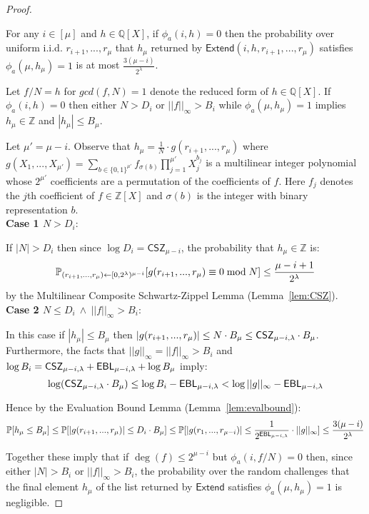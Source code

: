 \begin{proof}
\begin{subclaim} 
For any $i \in [\mu]$ and $h \in \mathbb{Q}[X]$, if $\phi_a(i, h) = 0$ then the probability over uniform i.i.d. $r_{i+1},...,r_\mu$ that $h_\mu$ returned by $\textsf{Extend}(i,h, r_{i+1},...,r_\mu)$ satisfies $\phi_a(\mu, h_\mu) = 1$ is at most $\frac{3(\mu - i)}{2^\lambda}$. 
\end{subclaim} 

Let $f/N = h$ for $gcd(f, N) = 1$ denote the reduced form of $h \in \mathbb{Q}[X]$. If $\phi_a(i,h) = 0$ then either $N > D_i$ or $||f||_\infty > B_i$ while $\phi_a(\mu, h_\mu) = 1$ implies $h_\mu \in \mathbb{Z}$ and $|h_\mu| \leq B_\mu$.

 Let $\mu' = \mu - i$. Observe that $h_\mu = \frac{1}{N} \cdot g(r_{i+1},...,r_\mu)$ where $g(X_1,...,X_{\mu'}) = \sum_{b \in \{0,1\}^{\mu'}} f_{\sigma(b)} \prod_{j=1}^{\mu'}X_j^{b_j}$ is a multilinear integer polynomial whose $2^{\mu'}$ coefficients are a permutation of the coefficients of $f$. Here $f_j$ denotes the $j$th coefficient of $f \in \mathbb{Z}[X]$ and $\sigma(b)$ is the integer with binary representation $b$. \\
 
 \noindent \textbf{Case 1 $N > D_i$}: 
 
 If $|N| > D_i$ then since $\log D_i = \mathsf{CSZ}_{\mu - i}$, the probability that $h_\mu \in \mathbb{Z}$ is:
 $$\Prob_{(r_{i+1},...,r_\mu) \gets [0,2^\lambda)^{\mu -i}} [g(r_{i+1},...,r_\mu)\equiv 0 \bmod N]  \leq \frac{\mu - i +1}{2^\lambda}$$
by the Multilinear Composite Schwartz-Zippel Lemma (Lemma~\ref{lem:CSZ}).\\

 
\noindent \textbf{Case 2 $N \leq D_i \ \wedge \ ||f||_\infty > B_i$}: 
 
In this case if $|h_\mu| \leq B_\mu$ then $|g(r_{i+1},...,r_{\mu})| \leq N \cdot B_\mu \leq \CSZ[\mu - i] \cdot B_\mu$. 
 Furthermore, the facts that $||g||_\infty = ||f||_\infty > B_i$ and $\log B_i = \CSZ[\mu - i] + \EBL[\mu - i] + \log B_\mu$ imply: 
 $$\log (\CSZ[\mu -i] \cdot B_\mu) \leq \log B_i - \EBL[\mu - i ] < \log ||g||_\infty - \EBL[\mu - i]$$
 
Hence by the Evaluation Bound Lemma (Lemma~\ref{lem:evalbound}): 
$$\Prob[h_\mu \leq B_\mu] \leq \Prob[|g(r_{i+1},...,r_{\mu})| \leq D_i \cdot B_\mu] \leq \Prob[|g(r_1,...,r_{\mu-i})| \leq \frac{1}{2^{\EBL[\mu - i]}} \cdot ||g||_\infty] \leq  \frac{3(\mu- i)}{2^{\lambda}}$$

 
Together these imply that if $\deg(f) \leq 2^{\mu -i}$ but $\phi_a(i, f/N) = 0$ then, since either $|N| > B_i$ or $||f||_\infty > B_i$, the probability over the random challenges that the final element $h_\mu$ of the list returned by $\textsf{Extend}$ satisfies $\phi_a(\mu, h_\mu) = 1$ is negligible. 

\end{proof} 

